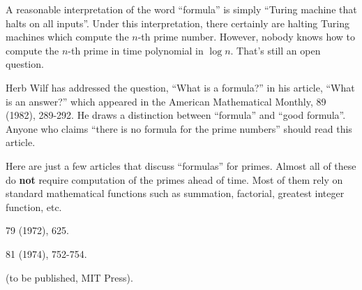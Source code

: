 A reasonable interpretation of the word ``formula'' is simply ``Turing
machine that halts on all inputs''.  Under this interpretation, there
certainly are halting Turing machines which compute the $n$-th prime
number.  However, nobody knows how to compute the $n$-th prime in time
polynomial in $\log n$.  That's still an open question.

Herb Wilf has addressed the question, ``What is a formula?'' in his
article, ``What is an answer?'' which appeared in the American
Mathematical Monthly, 89 (1982), 289-292.  He draws a distinction
between ``formula'' and ``good formula''.  Anyone who claims ``there is
no formula for the prime numbers'' should read this article.

Here are just a few articles that discuss ``formulas'' for primes.
Almost all of these do {\bf not} require computation of the primes ahead
of time.  Most of them rely on standard mathematical functions such as
summation, factorial, greatest integer function, etc.


\Ref










 {79 (1972),
  625.}

 {81 (1974),
  752-754.}

\medskip

  {(to be
  published, MIT Press).}  
